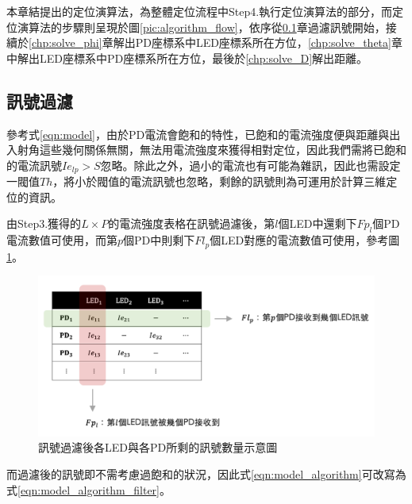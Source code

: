 本章結提出的定位演算法，為整體定位流程中Step4.執行定位演算法的部分，而定位演算法的步驟則呈現於圖\ref{pic:algorithm_flow}，依序從\ref{chp:algorithm_filter}章過濾訊號開始，接續於\ref{chp:solve_phi}章解出PD座標系中LED座標系所在方位，\ref{chp:solve_theta}章中解出LED座標系中PD座標系所在方位，最後於\ref{chp:solve_D}解出距離。



    \subsection{訊號過濾}
    \label{chp:algorithm_filter}

    參考式\ref{eqn:model}，由於PD電流會飽和的特性，已飽和的電流強度便與距離與出入射角這些幾何關係無關，無法用電流強度來獲得相對定位，因此我們需將已飽和的電流訊號$Ie_{lp}>S$忽略。除此之外，過小的電流也有可能為雜訊，因此也需設定一閥值$Th$，將小於閥值的電流訊號也忽略，剩餘的訊號則為可運用於計算三維定位的資訊。
    
    由Step3.獲得的$L\times P$的電流強度表格在訊號過濾後，第$l$個LED中還剩下$Fp_l$個PD電流數值可使用，而第$p$個PD中則剩下$Fl_p$個LED對應的電流數值可使用，參考圖\ref{pic:after_filter}。

    \begin{figure}[htpb]
        \centering
        \includegraphics[width=15cm]{ch3pic/after_filter.png}
        \caption{訊號過濾後各LED與各PD所剩的訊號數量示意圖}
        \label{pic:after_filter}
    \end{figure}

    而過濾後的訊號即不需考慮過飽和的狀況，因此式\ref{eqn:model_algorithm}可改寫為式\ref{eqn:model_algorithm_filter}。

